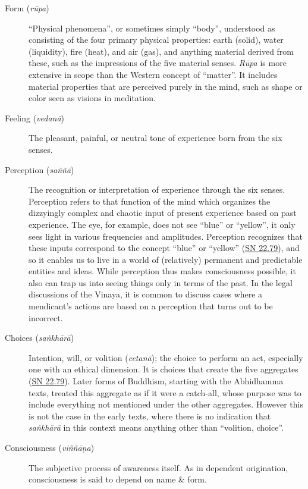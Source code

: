 \documentclass[12pt,openany]{book}%
\begin{document}
\begin{description}%
\item[Form (\textit{\textsanskrit{rūpa}})] “Physical phenomena”, or sometimes simply “body”, understood as consisting of the four primary physical properties: earth (solid), water (liquidity), fire (heat), and air (gas), and anything material derived from these, such as the impressions of the five material senses.
\textit{\textsanskrit{Rūpa}} is more extensive in scope than the Western concept of “matter”. It includes material properties that are perceived purely in the mind, such as shape or color seen as visions in meditation.%
\item[Feeling (\textit{\textsanskrit{vedanā}})] The pleasant, painful, or neutral tone of experience born from the six senses.%
\item[Perception (\textit{\textsanskrit{saññā}})] The recognition or interpretation of experience through the six senses.
Perception refers to that function of the mind which organizes the dizzyingly complex and chaotic input of present experience based on past experience. The eye, for example, does not see “blue” or “yellow”, it only sees light in various frequencies and amplitudes. Perception recognizes that these inputs correspond to the concept “blue” or “yellow” (\href{https://suttacentral.net/sn22.79}{SN 22.79}), and so it enables us to live in a world of (relatively) permanent and predictable entities and ideas. While perception thus makes consciousness possible, it also can trap us into seeing things only in terms of the past. In the legal discussions of the Vinaya, it is common to discuss cases where a mendicant’s actions are based on a perception that turns out to be incorrect.%
\item[Choices (\textit{\textsanskrit{saṅkhārā}})] Intention, will, or volition (\textit{\textsanskrit{cetanā}}); the choice to perform an act, especially one with an ethical dimension. It is choices that create the five aggregates (\href{https://suttacentral.net/sn22.79}{SN 22.79}).
Later forms of Buddhism, starting with the Abhidhamma texts, treated this aggregate as if it were a catch-all, whose purpose was to include everything not mentioned under the other aggregates. However this is not the case in the early texts, where there is no indication that \textit{\textsanskrit{saṅkhārā}} in this context means anything other than “volition, choice”.%
\item[Consciousness (\textit{\textsanskrit{viññāṇa}})] The subjective process of awareness itself.
As in dependent origination, consciousness is said to depend on name \& form.%
\end{description}
\end{document}
